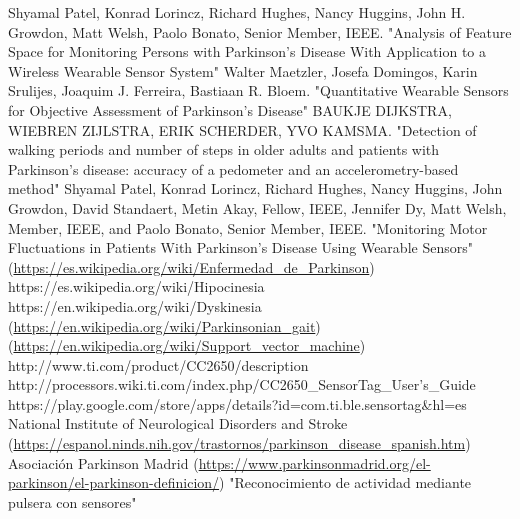 \documentclass[11pt,spanish]{article}
\begin{document}
\newpage
\begin{thebibliography}{10}
    Shyamal Patel, Konrad Lorincz, Richard Hughes, Nancy Huggins, John H. Growdon, Matt Welsh, Paolo 		Bonato, Senior Member, IEEE. "Analysis of Feature Space for Monitoring Persons with Parkinson’s
	Disease With Application to a Wireless Wearable Sensor System"
    Walter Maetzler, Josefa Domingos, Karin Srulijes, Joaquim J. Ferreira, Bastiaan R. Bloem.       	     "Quantitative Wearable Sensors for Objective Assessment of Parkinson’s Disease"
    BAUKJE DIJKSTRA, WIEBREN ZIJLSTRA, ERIK SCHERDER, YVO KAMSMA. "Detection of walking periods and 	     number of steps in older adults and patients with Parkinson’s disease: accuracy of a pedometer and       an accelerometry-based method"
    Shyamal Patel, Konrad Lorincz, Richard Hughes, Nancy Huggins, John Growdon, David Standaert, Metin       Akay, Fellow, IEEE, Jennifer Dy, Matt Welsh, Member, IEEE, and Paolo Bonato, Senior Member, IEEE.       "Monitoring Motor Fluctuations in Patients With Parkinson’s Disease Using Wearable Sensors"
     (\url{https://es.wikipedia.org/wiki/Enfermedad_de_Parkinson})
     https://es.wikipedia.org/wiki/Hipocinesia
     https://en.wikipedia.org/wiki/Dyskinesia
     (\url {https://en.wikipedia.org/wiki/Parkinsonian_gait})
     (\url {https://en.wikipedia.org/wiki/Support_vector_machine})
     http://www.ti.com/product/CC2650/description
     http://processors.wiki.ti.com/index.php/CC2650\_SensorTag\_User's\_Guide
     https://play.google.com/store/apps/details?id=com.ti.ble.sensortag\&hl=es
     National Institute of Neurological Disorders and Stroke (\url{https://espanol.ninds.nih.gov/trastornos/parkinson_disease_spanish.htm})
     Asociación Parkinson Madrid (\url{https://www.parkinsonmadrid.org/el-parkinson/el-parkinson-definicion/})
     "Reconocimiento de actividad mediante pulsera con sensores"
\end{thebibliography}
\end{document}
